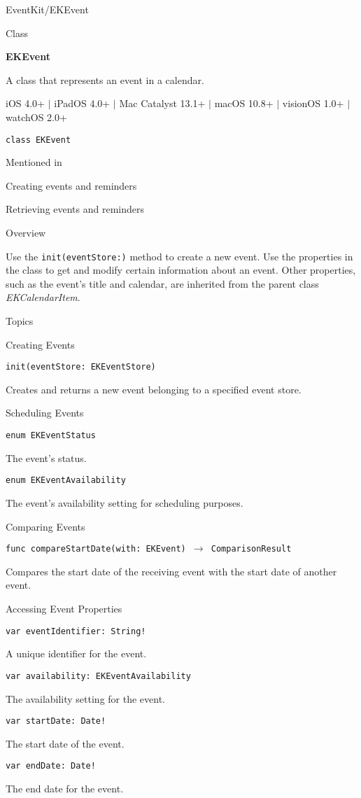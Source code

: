\documentclass{article}
\title{}
\author{}
\date{}
\begin{document}
EventKit/EKEvent

Class

\textbf{EKEvent}

A class that represents an event in a calendar.

iOS 4.0+ $|$ iPadOS 4.0+ $|$ Mac Catalyst 13.1+ $|$ macOS 10.8+ $|$ visionOS 1.0+ $|$ watchOS 2.0+

\texttt{class EKEvent}

Mentioned in

Creating events and reminders

Retrieving events and reminders

Overview

Use the \texttt{init(eventStore:)} method to create a new event. Use the properties in the class to get and modify certain information about an event. Other properties, such as the event's title and calendar, are inherited from the parent class \textit{EKCalendarItem}.

Topics

Creating Events

\texttt{init(eventStore: EKEventStore)}

Creates and returns a new event belonging to a specified event store.

Scheduling Events

\texttt{enum EKEventStatus}

The event's status.

\texttt{enum EKEventAvailability}

The event's availability setting for scheduling purposes.

Comparing Events

\texttt{func compareStartDate(with: EKEvent) $\rightarrow$ ComparisonResult}

Compares the start date of the receiving event with the start date of another event.

Accessing Event Properties

\texttt{var eventIdentifier: String!}

A unique identifier for the event.

\texttt{var availability: EKEventAvailability}

The availability setting for the event.

\texttt{var startDate: Date!}

The start date of the event.

\texttt{var endDate: Date!}

The end date for the event.
\end{document}
